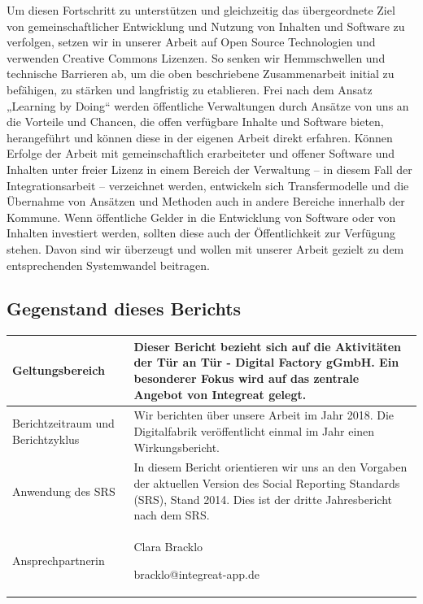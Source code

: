 \documentclass[12pt, a4paper]{article} %
\begin{document}
Um diesen Fortschritt zu unterstützen und gleichzeitig das übergeordnete
Ziel von gemeinschaftlicher Entwicklung und Nutzung von Inhalten und
Software zu verfolgen, setzen wir in unserer Arbeit auf Open Source
Technologien und verwenden Creative Commons Lizenzen. So senken wir
Hemmschwellen und technische Barrieren ab, um die oben beschriebene
Zusammenarbeit initial zu befähigen, zu stärken und langfristig zu
etablieren. Frei nach dem Ansatz „Learning by Doing“ werden öffentliche
Verwaltungen durch Ansätze von uns an die Vorteile und Chancen, die
offen verfügbare Inhalte und Software bieten, herangeführt und können
diese in der eigenen Arbeit direkt erfahren. Können Erfolge der Arbeit
mit gemeinschaftlich erarbeiteter und offener Software und Inhalten
unter freier Lizenz in einem Bereich der Verwaltung – in diesem Fall der
Integrationsarbeit – verzeichnet werden, entwickeln sich Transfermodelle
und die Übernahme von Ansätzen und Methoden auch in andere Bereiche
innerhalb der Kommune. Wenn öffentliche Gelder in die Entwicklung von
Software oder von Inhalten investiert werden, sollten diese auch der
Öffentlichkeit zur Verfügung stehen. Davon sind wir überzeugt und wollen
mit unserer Arbeit gezielt zu dem entsprechenden Systemwandel beitragen.

\hypertarget{gegenstand-dieses-berichts}{%
\subsection{Gegenstand dieses
Berichts}\label{gegenstand-dieses-berichts}}

\begin{tabularx}{\textwidth}{p{4cm}X}
\toprule
Geltungsbereich & Dieser Bericht bezieht sich auf die Aktivitäten der
Tür an Tür - Digital Factory gGmbH. Ein besonderer Fokus wird auf das
zentrale Angebot von Integreat gelegt.\tabularnewline
\midrule
Berichtzeitraum und Berichtzyklus & Wir berichten über unsere Arbeit im
Jahr 2018. Die Digitalfabrik veröffentlicht einmal im Jahr einen
Wirkungsbericht.\tabularnewline
\midrule
Anwendung des SRS & In diesem Bericht orientieren wir uns an den
Vorgaben der aktuellen Version des Social Reporting Standards (SRS),
Stand 2014. Dies ist der dritte Jahresbericht nach dem
SRS.\tabularnewline
\midrule
Ansprechpartnerin & \begin{minipage}[t]{\columnwidth}
Clara Bracklo

bracklo@integreat-app.de\end{minipage}\tabularnewline

\bottomrule
\end{tabularx}
\end{document}
